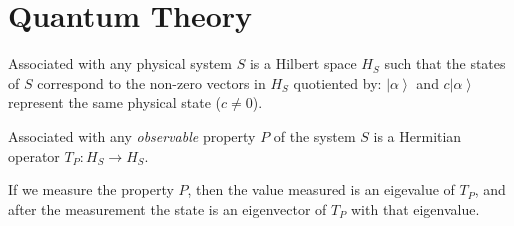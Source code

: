 \documentclass{book}
\theoremstyle{definition}
\newcommand{\ket}[1]{\ensuremath{\left| {#1} \right\rangle}}
\begin{document}
\part{Quantum Theory}

Associated with any physical system $S$ is a Hilbert space $H_S$ such that the states of $S$ correspond to the non-zero vectors in $H_S$ quotiented by: $\ket{\alpha}$ and $c \ket{\alpha}$ represent the same physical state ($c \neq 0$).

Associated with any \emph{observable} property $P$ of the system $S$ is a Hermitian operator $T_P : H_S \rightarrow H_S$.

If we measure the property $P$, then the value measured is an eigevalue of $T_P$, and after the measurement the state is an eigenvector of $T_P$ with that eigenvalue.
\end{document}
